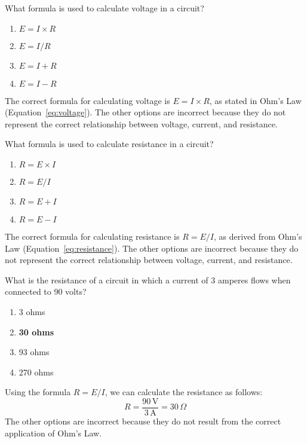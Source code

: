 
\begin{tcolorbox}[colback=gray!10!white,colframe=black!75!black,title={T5D02}]
    What formula is used to calculate voltage in a circuit?
    \begin{enumerate}[label=\Alph*),noitemsep]
        \item \textbf{\(E = I \times R\)}
        \item \(E = I / R\)
        \item \(E = I + R\)
        \item \(E = I - R\)
    \end{enumerate}
\end{tcolorbox}
The correct formula for calculating voltage is \(E = I \times R\), as stated in Ohm's Law (Equation~\ref{eq:voltage}). The other options are incorrect because they do not represent the correct relationship between voltage, current, and resistance.


\begin{tcolorbox}[colback=gray!10!white,colframe=black!75!black,title={T5D03}]
    What formula is used to calculate resistance in a circuit?
    \begin{enumerate}[label=\Alph*),noitemsep]
        \item \(R = E \times I\)
        \item \textbf{\(R = E / I\)}
        \item \(R = E + I\)
        \item \(R = E - I\)
    \end{enumerate}
\end{tcolorbox}
The correct formula for calculating resistance is \(R = E / I\), as derived from Ohm's Law (Equation~\ref{eq:resistance}). The other options are incorrect because they do not represent the correct relationship between voltage, current, and resistance.


\begin{tcolorbox}[colback=gray!10!white,colframe=black!75!black,title={T5D04}]
    What is the resistance of a circuit in which a current of 3 amperes flows when connected to 90 volts?
    \begin{enumerate}[label=\Alph*),noitemsep]
        \item 3 ohms
        \item \textbf{30 ohms}
        \item 93 ohms
        \item 270 ohms
    \end{enumerate}
\end{tcolorbox}
Using the formula \(R = E / I\), we can calculate the resistance as follows:
\[
R = \frac{90\, \text{V}}{3\, \text{A}} = 30\, \Omega
\]
The other options are incorrect because they do not result from the correct application of Ohm's Law.

